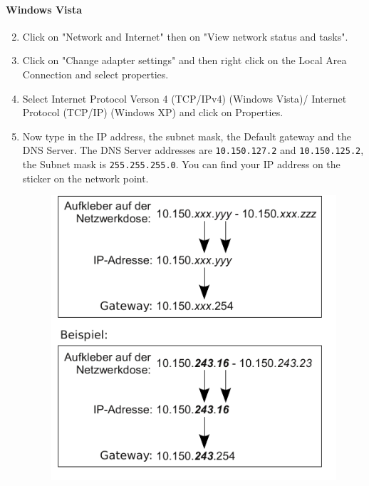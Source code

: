 \documentclass[a4paper,12pt]{scrartcl}
\begin{document}
\paragraph*{Windows Vista}
\begin{enumerate}
    \setcounter{enumi}{1}
    \item Click on "Network and Internet" then on "View network status and tasks".
    \item Click on "Change adapter settings" and then right click on the Local Area Connection and select properties.
    \setcounter{enumi}{4}
    \item Select Internet Protocol Verson 4 (TCP/IPv4) (Windows Vista)/ Internet Protocol  (TCP/IP) (Windows XP) and click on Properties.
    \item Now type in the IP address, the subnet mask, the Default gateway and the DNS Server. The DNS Server addresses are \nolinkurl{10.150.127.2} and \nolinkurl{10.150.125.2}, the Subnet mask is \nolinkurl{255.255.255.0}. You can find your IP address on the sticker on the network point.
      \begin{figure}[h!]
	\centering
        \vspace{-5pt}
        \begin{minipage}[c]{0.45\linewidth}
          \centering
          \includegraphics[width=\linewidth,keepaspectratio]{Bilder/IP_Gerneric}

\end{minipage}
\end{figure}
\end{enumerate}
\end{document}
